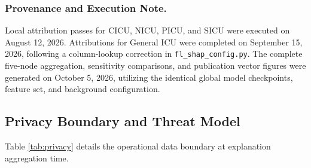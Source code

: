 \documentclass[sigconf,review,anonymous]{acmart}
\begin{document}
\subsubsection{Provenance and Execution Note.}
Local attribution passes for CICU, NICU, PICU, and SICU were executed on August 12, 2026. Attributions for General ICU were completed on September 15, 2026, following a column-lookup correction in \texttt{fl\_shap\_config.py}. The complete five-node aggregation, sensitivity comparisons, and publication vector figures were generated on October 5, 2026, utilizing the identical global model checkpoints, feature set, and background configuration.

\subsection{Privacy Boundary and Threat Model}
Table \ref{tab:privacy} details the operational data boundary at explanation aggregation time.

\begin{table}[t]
\caption{Operational data boundary at explanation aggregation time}
\label{tab:privacy}
\centering
\small
{}
\end{table}
\end{document}
